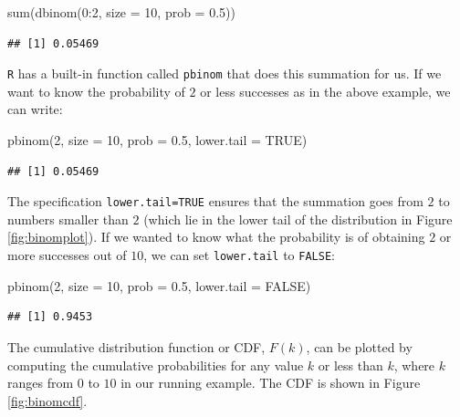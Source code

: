 \documentclass[
  12pt,
]{krantz}
\newenvironment{Shaded}{\begin{snugshade}}{\end{snugshade}}
\newcommand{\AttributeTok}[1]{\textcolor[rgb]{0.77,0.63,0.00}{#1}}
\newcommand{\ConstantTok}[1]{\textcolor[rgb]{0.00,0.00,0.00}{#1}}
\newcommand{\DecValTok}[1]{\textcolor[rgb]{0.00,0.00,0.81}{#1}}
\newcommand{\FloatTok}[1]{\textcolor[rgb]{0.00,0.00,0.81}{#1}}
\newcommand{\FunctionTok}[1]{\textcolor[rgb]{0.00,0.00,0.00}{#1}}
\newcommand{\NormalTok}[1]{#1}
\newcommand{\SpecialCharTok}[1]{\textcolor[rgb]{0.00,0.00,0.00}{#1}}
\theoremstyle{definition}
\theoremstyle{definition}
\theoremstyle{definition}
\theoremstyle{definition}
\theoremstyle{remark}
\begin{document}
\begin{Shaded}
\begin{Highlighting}[]
\FunctionTok{sum}\NormalTok{(}\FunctionTok{dbinom}\NormalTok{(}\DecValTok{0}\SpecialCharTok{:}\DecValTok{2}\NormalTok{, }\AttributeTok{size =} \DecValTok{10}\NormalTok{, }\AttributeTok{prob =} \FloatTok{0.5}\NormalTok{))}
\end{Highlighting}
\end{Shaded}

\begin{verbatim}
## [1] 0.05469
\end{verbatim}

\texttt{R} has a built-in function called \texttt{pbinom} that does this summation for us. If we want to know the probability of \(2\) or less successes as in the above example, we can write:

\begin{Shaded}
\begin{Highlighting}[]
\FunctionTok{pbinom}\NormalTok{(}\DecValTok{2}\NormalTok{, }\AttributeTok{size =} \DecValTok{10}\NormalTok{, }\AttributeTok{prob =} \FloatTok{0.5}\NormalTok{, }\AttributeTok{lower.tail =} \ConstantTok{TRUE}\NormalTok{)}
\end{Highlighting}
\end{Shaded}

\begin{verbatim}
## [1] 0.05469
\end{verbatim}

The specification \texttt{lower.tail=TRUE} ensures that the summation goes from \(2\) to numbers smaller than \(2\) (which lie in the lower tail of the distribution in Figure \ref{fig:binomplot}). If we wanted to know what the probability is of obtaining \(2\) or more successes out of \(10\), we can set \texttt{lower.tail} to \texttt{FALSE}:

\begin{Shaded}
\begin{Highlighting}[]
\FunctionTok{pbinom}\NormalTok{(}\DecValTok{2}\NormalTok{, }\AttributeTok{size =} \DecValTok{10}\NormalTok{, }\AttributeTok{prob =} \FloatTok{0.5}\NormalTok{, }\AttributeTok{lower.tail =} \ConstantTok{FALSE}\NormalTok{)}
\end{Highlighting}
\end{Shaded}

\begin{verbatim}
## [1] 0.9453
\end{verbatim}

The cumulative distribution function or CDF, \(F(k)\), can be plotted by computing the cumulative probabilities for any value \(k\) or less than \(k\), where \(k\) ranges from \(0\) to \(10\) in our running example. The CDF is shown in Figure \ref{fig:binomcdf}.
\end{document}
